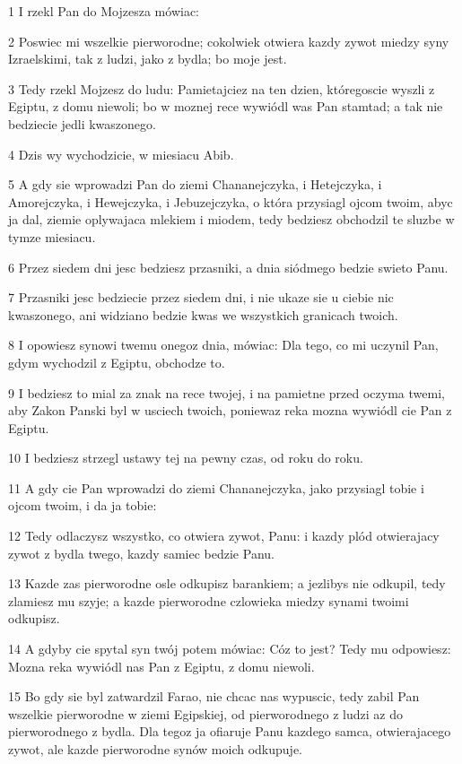 \par 1 I rzekl Pan do Mojzesza mówiac:
\par 2 Poswiec mi wszelkie pierworodne; cokolwiek otwiera kazdy zywot miedzy syny Izraelskimi, tak z ludzi, jako z bydla; bo moje jest.
\par 3 Tedy rzekl Mojzesz do ludu: Pamietajciez na ten dzien, któregoscie wyszli z Egiptu, z domu niewoli; bo w moznej rece wywiódl was Pan stamtad; a tak nie bedziecie jedli kwaszonego.
\par 4 Dzis wy wychodzicie, w miesiacu Abib.
\par 5 A gdy sie wprowadzi Pan do ziemi Chananejczyka, i Hetejczyka, i Amorejczyka, i Hewejczyka, i Jebuzejczyka, o która przysiagl ojcom twoim, abyc ja dal, ziemie oplywajaca mlekiem i miodem, tedy bedziesz obchodzil te sluzbe w tymze miesiacu.
\par 6 Przez siedem dni jesc bedziesz przasniki, a dnia siódmego bedzie swieto Panu.
\par 7 Przasniki jesc bedziecie przez siedem dni, i nie ukaze sie u ciebie nic kwaszonego, ani widziano bedzie kwas we wszystkich granicach twoich.
\par 8 I opowiesz synowi twemu onegoz dnia, mówiac: Dla tego, co mi uczynil Pan, gdym wychodzil z Egiptu, obchodze to.
\par 9 I bedziesz to mial za znak na rece twojej, i na pamietne przed oczyma twemi, aby Zakon Panski byl w usciech twoich, poniewaz reka mozna wywiódl cie Pan z Egiptu.
\par 10 I bedziesz strzegl ustawy tej na pewny czas, od roku do roku.
\par 11 A gdy cie Pan wprowadzi do ziemi Chananejczyka, jako przysiagl tobie i ojcom twoim, i da ja tobie:
\par 12 Tedy odlaczysz wszystko, co otwiera zywot, Panu: i kazdy plód otwierajacy zywot z bydla twego, kazdy samiec bedzie Panu.
\par 13 Kazde zas pierworodne osle odkupisz barankiem; a jezlibys nie odkupil, tedy zlamiesz mu szyje; a kazde pierworodne czlowieka miedzy synami twoimi odkupisz.
\par 14 A gdyby cie spytal syn twój potem mówiac: Cóz to jest? Tedy mu odpowiesz: Mozna reka wywiódl nas Pan z Egiptu, z domu niewoli.
\par 15 Bo gdy sie byl zatwardzil Farao, nie chcac nas wypuscic, tedy zabil Pan wszelkie pierworodne w ziemi Egipskiej, od pierworodnego z ludzi az do pierworodnego z bydla. Dla tegoz ja ofiaruje Panu kazdego samca, otwierajacego zywot, ale kazde pierworodne synów moich odkupuje.
